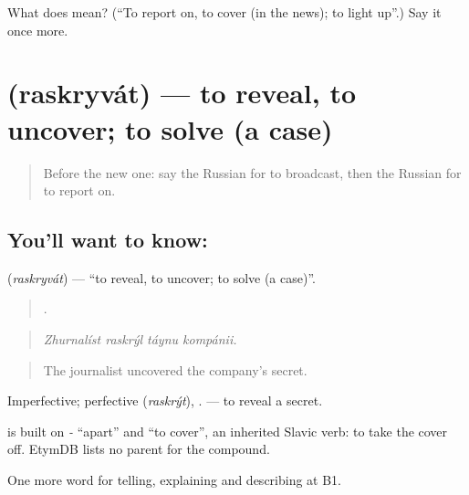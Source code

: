 \begin{tcolorbox}[breakable,colback=teal!4,colframe=teal!35!black,title={Before you move on}]
What does  mean? (\textquotedblleft{}To report on, to cover (in the news); to light up\textquotedblright{}.) Say it once more.
\end{tcolorbox}
\section[\texorpdfstring{\ru{раскрывать} (raskryvát)}{раскрывать (raskryvát)}]{ (raskryvát) — to reveal, to uncover; to solve (a case)}

\label{lesson:RU-C286-raskryvat}



\begin{quote}
Before the new one: say the Russian for to broadcast, then the Russian for to report on.
\end{quote}

\subsection*{You'll want to know: }
\textbf{} (\emph{raskryvát}) — \textquotedblleft{}to reveal, to uncover; to solve (a case)\textquotedblright{}.

\begin{quote}
   .
\end{quote}

\begin{quote}
\emph{Zhurnalíst raskrýl táynu kompánii.}
\end{quote}

\begin{quote}
The journalist uncovered the company's secret.
\end{quote}

Imperfective; perfective \emph{} (\emph{raskrýt}), \emph{ }. \emph{ } — to reveal a secret.

\begin{cousinweb}
\emph{} is built on \emph{-} \textquotedblleft{}apart\textquotedblright{} and \emph{} \textquotedblleft{}to cover\textquotedblright{}, an inherited Slavic verb: to take the cover off. EtymDB lists no parent for the compound.
\end{cousinweb}

\begin{grammarlens}[title={What you've built}]
One more word for telling, explaining and describing at B1.
\end{grammarlens}

